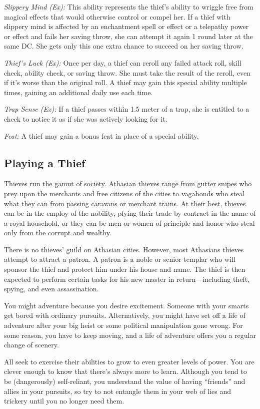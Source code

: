 \textit{Slippery Mind (Ex):} This ability represents the thief's ability to wriggle free from magical effects that would otherwise control or compel her. If a thief with slippery mind is affected by an enchantment spell or effect or a telepathy power or effect and fails her saving throw, she can attempt it again 1 round later at the same DC. She gets only this one extra chance to succeed on her saving throw.

\textit{Thief's Luck (Ex):} Once per day, a thief can reroll any failed attack roll, skill check, ability check, or saving throw. She must take the result of the reroll, even if it's worse than the original roll. A thief may gain this special ability multiple times, gaining an additional daily use each time.

\textit{Trap Sense (Ex):} If a thief passes within 1.5 meter of a trap, she is entitled to a  check to notice it as if she was actively looking for it.

\textit{Feat:} A thief may gain a bonus feat in place of a special ability.

\subsection{Playing a Thief}
Thieves run the gamut of society. Athasian thieves range from gutter snipes who prey upon the merchants and free citizens of the cities to vagabonds who steal what they can from passing caravans or merchant trains. At their best, thieves can be in the employ of the nobility, plying their trade by contract in the name of a royal household, or they can be men or women of principle and honor who steal only from the corrupt and wealthy.

There is no thieves' guild on Athasian cities. However, most Athasians thieves attempt to attract a patron. A patron is a noble or senior templar who will sponsor the thief and protect him under his house and name. The thief is then expected to perform certain tasks for his new master in return---including theft, spying, and even assassination.

You might adventure because you desire excitement. Someone with your smarts get bored with ordinary pursuits. Alternatively, you might have set off a life of adventure after your big heist or some political manipulation gone wrong. For some reason, you have to keep moving, and a life of adventure offers you a regular change of scenery.

All seek to exercise their abilities to grow to even greater levels of power. You are clever enough to know that there's always more to learn. Although you tend to be (dangerously) self-reliant, you understand the value of having ``friends'' and allies in your pursuits, so try to not entangle them in your web of lies and trickery until you no longer need them.

